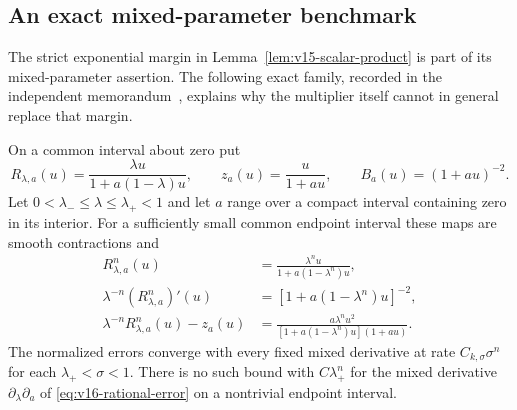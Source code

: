 \subsection{An exact mixed-parameter benchmark}
\label{sec:v16-strict-margin}
The strict exponential margin in Lemma~\ref{lem:v15-scalar-product}
is part of its mixed-parameter assertion. The following exact family,
recorded in the independent memorandum~\cite{A2ReviewV15}, explains
why the multiplier itself cannot in general replace that margin.

\begin{proposition}
\label{prop:v16-strict-margin}
On a common interval about zero put
\[
 R_{\lambda,a}(u)=\frac{\lambda u}{1+a(1-\lambda)u},\qquad
 z_a(u)=\frac{u}{1+au},\qquad B_a(u)=(1+au)^{-2}.
\]
Let $0<\lambda_-\le\lambda\le\lambda_+<1$ and let $a$ range over a
compact interval containing zero in its interior. For a sufficiently
small common endpoint interval these maps are smooth contractions and
\begin{align}
 R_{\lambda,a}^n(u)
 &=\frac{\lambda^n u}{1+a(1-\lambda^n)u},
                                      \label{eq:v16-rational-iterate}\\
 \lambda^{-n}(R_{\lambda,a}^n)'(u)
 &=[1+a(1-\lambda^n)u]^{-2},
                                      \label{eq:v16-rational-density}\\
 \lambda^{-n}R_{\lambda,a}^n(u)-z_a(u)
 &=\frac{a\lambda^nu^2}
       {[1+a(1-\lambda^n)u](1+au)}.
                                      \label{eq:v16-rational-error}
\end{align}
The normalized errors converge with every fixed mixed derivative at
rate $C_{k,\sigma}\sigma^n$ for each $\lambda_+<\sigma<1$.
There is no such bound with $C\lambda_+^n$ for the mixed derivative
$\partial_\lambda\partial_a$ of
\eqref{eq:v16-rational-error} on a nontrivial endpoint interval.
\end{proposition}
